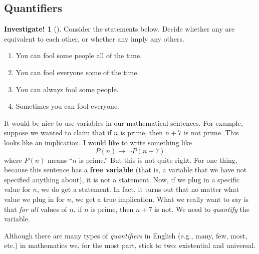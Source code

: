 \documentclass[10pt,]{book}
\newcommand{\terminology}[1]{\textbf{#1}}
\theoremstyle{plain}
\theoremstyle{definition}
\theoremstyle{definition}
\newtheorem{investigation}[project]{Investigate!}
\numberwithin{equation}{chapter}
\newcommand{\imp}{\rightarrow}
\begin{document}
\subsection[{Quantifiers}]{Quantifiers}\label{subsec_quantifiers}
\begin{investigation}[]\label{investigation-3}
\hypertarget{p-143}{}%
Consider the statements below. Decide whether any are equivalent to each other, or whether any imply any others.%
\par
\hypertarget{p-144}{}%
%
\begin{enumerate}
\item\hypertarget{li-63}{}\hypertarget{p-145}{}%
You can fool some people all of the time.%
\item\hypertarget{li-64}{}\hypertarget{p-146}{}%
You can fool everyone some of the time.%
\item\hypertarget{li-65}{}\hypertarget{p-147}{}%
You can always fool some people.%
\item\hypertarget{li-66}{}\hypertarget{p-148}{}%
Sometimes you can fool everyone.%
\end{enumerate}
%
\end{investigation}
\hypertarget{p-149}{}%
It would be nice to use variables in our mathematical sentences. For example, suppose we wanted to claim that if \(n\) is prime, then \(n+7\) is not prime. This looks like an implication. I would like to write something like%
\begin{equation*}
P(n) \imp \neg P(n+7) 
\end{equation*}
where \(P(n)\) means ``\(n\) is prime.'' But this is not quite right. For one thing, because this sentence has a \terminology{free variable} (that is, a variable that we have not specified anything about), it is not a statement. Now, if we plug in a specific value for \(n\), we do get a statement. In fact, it turns out that no matter what value we plug in for \(n\), we get a true implication. What we really want to say is that \emph{for all} values of \(n\), if \(n\) is prime, then \(n+7\) is not. We need to \emph{quantify} the variable.%
\par
\hypertarget{p-150}{}%
Although there are many types of \emph{quantifiers} in English (e.g., many, few, most, etc.) in mathematics we, for the most part, stick to two: existential and universal.%
\end{document}
